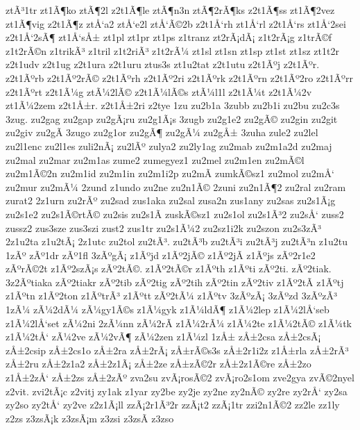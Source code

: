 {ztÃ³1tr
zt1Ã¶ko
ztÃ¶2l
z2t1Ã¶le
ztÃ¶n3n
ztÃ¶2rÃ¶ks
z2t1Ã¶ss
zt1Ã¶2vez
zt1Ã¶vig
z2t1Ã¶z
ztÅ‘a2
ztÅ‘e2l
ztÅ‘Ã©2b
z2t1Å‘rh
zt1Å‘rl
z2t1Å‘rs
zt1Å‘2sei
z2t1Å‘2sÃ¶
zt1Å‘sÅ±
zt1pl
zt1pr
zt1ps
z1tranz
zt2rÃ¡dÃ¡
z1t2rÃ¡g
z1trÃ©f
z1t2rÃ©n
z1trikÃ³
z1tril
z1t2riÃ³
z1t2rÃ¼
zt1sl
zt1sn
zt1sp
zt1st
zt1sz
zt1t2r
z2t1udv
z2t1ug
z2t1ura
z2t1uru
ztus3s
zt1u2tat
z2t1utu
z2t1Ãºj
z2t1Ãºr.
z2t1Ãºrb
z2t1Ãº2rÃ©
z2t1Ãºrh
z2t1Ãº2ri
z2t1Ãºrk
z2t1Ãºrn
z2t1Ãº2ro
z2t1Ãºrr
z2t1Ãºrt
z2t1Ã¼g
ztÃ¼2lÃ©
z2t1Ã¼lÃ©s
ztÃ¼l1l
z2t1Ã¼t
z2t1Ã¼2v
zt1Ã¼2zem
z2t1Å±r.
z2t1Å±2ri
z2tye
1zu
zu2b1a
3zubb
zu2b1i
zu2bu
zu2c3s
3zug.
zu2gag
zu2gap
zu2gÃ¡ru
zu2g1Ã¡s
3zugb
zu2g1e2
zu2gÃ©
zu2gin
zu2git
zu2giv
zu2gÃ­
3zugo
zu2g1or
zu2gÃ¶
zu2gÃ¼
zu2gÅ±
3zuha
zule2
zu2lel
zu2l1enc
zu2l1es
zuli2nÃ¡
zu2lÃº
zulya2
zu2ly1ag
zu2mab
zu2m1a2d
zu2maj
zu2mal
zu2mar
zu2m1as
zume2
zumegyez1
zu2mel
zu2m1en
zu2mÃ©l
zu2m1Ã©2n
zu2m1id
zu2m1in
zu2m1i2p
zu2mÃ­
zumkÃ©sz1
zu2mol
zu2mÅ‘
zu2mur
zu2mÃ¼
2zund
z1undo
zu2ne
zu2n1Ã©
2zuni
zu2n1Ã¶2
zu2ral
zu2ram
zurat2
2z1urn
zu2rÃº
zu2sad
zus1aka
zu2sal
zusa2n
zus1any
zu2sas
zu2s1Ã¡g
zu2s1e2
zu2s1Ã©rtÃ©
zu2sis
zu2s1Ã­
zuskÃ©sz1
zu2s1ol
zu2s1Ã³2
zu2sÅ‘
zuss2
zussz2
zus3sze
zus3szi
zust2
zus1tr
zu2s1Ã¼2
zu2sz1i2k
zu2szon
zu2s3zÃ³
2z1u2ta
z1u2tÃ¡
2z1utc
zu2tol
zu2tÃ³.
zu2tÃ³b
zu2tÃ³i
zu2tÃ³j
zu2tÃ³n
z1u2tu
1zÃº
zÃº1dr
zÃº1fl
3zÃºgÃ¡
z1Ãºjd
z1Ãº2jÃ©
z1Ãº2jÃ­
z1Ãºjs
zÃº2r1e2
zÃºrÃ©2t
z1Ãº2szÃ¡s
zÃº2tÃ©.
z1Ãº2tÃ©r
z1Ãºth
z1Ãºti
zÃº2ti.
zÃº2tiak.
3z2Ãºtiaka
zÃº2tiakr
zÃº2tib
zÃº2tig
zÃº2tih
zÃº2tin
zÃº2tiv
z1Ãº2tÃ­
z1Ãºtj
z1Ãºtn
z1Ãº2ton
z1ÃºtrÃ³
z1Ãºtt
zÃº2tÃ¼
z1Ãºtv
3zÃºzÃ¡
3zÃºzd
3zÃºzÃ³
1zÃ¼
zÃ¼2dÃ¼
zÃ¼gy1Ã©s
z1Ã¼gyk
z1Ã¼ldÃ¶
z1Ã¼2lep
z1Ã¼2lÅ‘seb
z1Ã¼2lÅ‘set
zÃ¼2ni
2zÃ¼nn
zÃ¼2rÃ­
z1Ã¼2rÃ¼
z1Ã¼2te
z1Ã¼2tÃ©
z1Ã¼tk
z1Ã¼2tÅ‘
zÃ¼2ve
zÃ¼2vÃ¶
zÃ¼2zen
z1Ã¼zl
1zÅ±
zÅ±2csa
zÅ±2csÃ¡
zÅ±2csip
zÅ±2cs1o
zÅ±2ra
zÅ±2rÃ¡
zÅ±rÃ©s3s
zÅ±2r1i2z
z1Å±rla
zÅ±2rÃ³
zÅ±2ru
zÅ±2z1a2
zÅ±2z1Ã¡
zÅ±2ze
zÅ±zÃ©2r
zÅ±2z1Ã©re
zÅ±2zo
z1Å±2zÅ‘
zÅ±2zs
zÅ±2zÃº
zva2su
zvÃ¡rosÃ©2
zvÃ¡ro2s1om
zve2gya
zvÃ©2nyel
z2vit.
zvi2tÃ¡c
z2vitj
zy1ak
z1yar
zy2be
zy2je
zy2ne
zy2nÃ©
zy2re
zy2rÅ‘
zy2sa
zy2so
zy2tÅ‘
zy2ve
z2z1Ã¡ll
zzÃ¡2r1Ã³2r
zzÃ¡t2
zzÃ¡1tr
zzi2n1Ã©2
zz2le
zz1ly
z2zs
z3zsÃ¡k
z3zsÃ¡m
z3zsi
z3zsÃ­
z3zso
}
